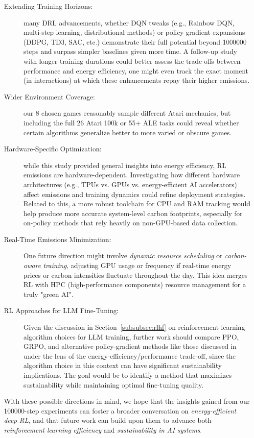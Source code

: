 \begin{description}
	\item[Extending Training Horizons:] many DRL advancements, whether DQN tweaks (e.g., Rainbow DQN, multi-step learning, distributional methods) or policy gradient expansions (DDPG, TD3, SAC, etc.) demonstrate their full potential beyond \num{1000000} steps and surpass simpler baselines given more time. A follow-up study with longer training durations could better assess the trade-offs between performance and energy efficiency, one might even track the exact moment (in interactions) at which these enhancements repay their higher emissions.
	
	\item[Wider Environment Coverage:] our 8 chosen games reasonably sample different Atari mechanics, but including the full 26 Atari 100k or 55+ ALE tasks could reveal whether certain algorithms generalize better to more varied or obscure games.
	
	\item[Hardware-Specific Optimization:] while this study provided general insights into energy efficiency, RL emissions are hardware-dependent. Investigating how different hardware architectures (e.g., TPUs vs. GPUs vs. energy-efficient AI accelerators) affect emissions and training dynamics could refine deployment strategies. Related to this, a more robust toolchain for CPU and RAM tracking would help produce more accurate system-level carbon footprints, especially for on-policy methods that rely heavily on non-GPU-based data collection.
		
	\item[Real-Time Emissions Minimization:] One future direction might involve \emph{dynamic resource scheduling} or 
	\emph{carbon-aware training}, adjusting GPU usage or frequency if real-time energy prices or carbon intensities fluctuate throughout the day. This idea merges RL with HPC (high-performance components) resource management for a truly "green AI".
	
	\item[RL Approaches for LLM Fine-Tuning:] Given the discussion in Section~\ref{subsubsec:rlhf} on reinforcement learning algorithm choices for LLM training, further work should compare PPO, GRPO, and alternative policy-gradient methods like those discussed in~\cite{ahmadian:back_to_basics} under the lens of the energy-efficiency/performance trade-off, since the algorithm choice in this context can have significant sustainability implications. The goal would be to identify a method that maximizes sustainability while maintaining optimal fine-tuning quality.
\end{description}

With these possible directions in mind, we hope that the insights gained from our \num{100000}-step experiments can foster a broader conversation on \emph{energy-efficient deep RL}, and that future work can build upon them to advance both \emph{reinforcement learning efficiency} and \emph{sustainability in AI systems}.
